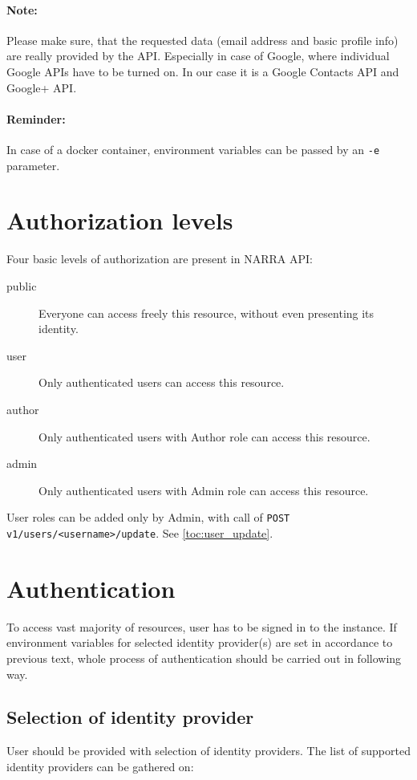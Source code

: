 \documentclass{book}
\begin{document}
\paragraph{Note:} Please make sure, that the requested data (email address and basic profile info) are really provided by the API. Especially in case of Google, where individual Google APIs have to be turned on. In our case it is a Google Contacts API and Google+ API.

\paragraph{Reminder:} In case of a docker container, environment variables can be passed by an \texttt{-e} parameter.

\section{Authorization levels}
\label{toc:alevels}
Four basic levels of authorization are present in NARRA API:

\begin{description}
\item[public] Everyone can access freely this resource, without even presenting its identity.
\item[user] Only authenticated users can access this resource.
\item[author] Only authenticated users with Author role can access this resource.
\item[admin] Only authenticated users with Admin role can access this resource.
\end{description}

User roles can be added only by Admin, with call of \texttt{POST v1/users/<username>/update}. See \ref{toc:user_update}.

\section{Authentication}
To access vast majority of resources, user has to be signed in to the instance. If environment variables for selected identity provider(s) are set in accordance to previous text, whole process of authentication should be carried out in following way.

\subsection{Selection of identity provider}
User should be provided with selection of identity providers. The list of supported identity providers can be gathered on:
\end{document}
